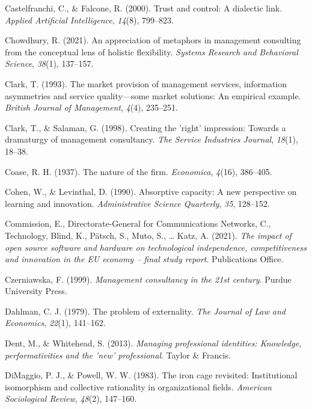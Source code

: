 \documentclass[
  man,floatsintext]{apa6}
\newlength{\cslhangindent}
\newenvironment{CSLReferences}[2] %
 {\begin{list}{}{%
  \setlength{\itemindent}{0pt}
  \setlength{\leftmargin}{0pt}
  \setlength{\parsep}{0pt}
  \ifodd #1
   \setlength{\leftmargin}{\cslhangindent}
   \setlength{\itemindent}{-1\cslhangindent}
  \fi
  \setlength{\itemsep}{#2\baselineskip}}}
 {\end{list}}
\begin{document}
\begin{CSLReferences}{1}{0}
Castelfranchi, C., \& Falcone, R. (2000). Trust and control: A dialectic link. \emph{Applied Artificial Intelligence}, \emph{14}(8), 799--823.

Chowdhury, R. (2021). An appreciation of metaphors in management consulting from the conceptual lens of holistic flexibility. \emph{Systems Research and Behavioral Science}, \emph{38}(1), 137--157.

Clark, T. (1993). The market provision of management services, information asymmetries and service quality---some market solutions: An empirical example. \emph{British Journal of Management}, \emph{4}(4), 235--251.

Clark, T., \& Salaman, G. (1998). Creating the 'right' impression: Towards a dramaturgy of management consultancy. \emph{The Service Industries Journal}, \emph{18}(1), 18--38.

Coase, R. H. (1937). The nature of the firm. \emph{Economica}, \emph{4}(16), 386--405.

Cohen, W., \& Levinthal, D. (1990). Absorptive capacity: A new perspective on learning and innovation. \emph{Administrative Science Quarterly}, \emph{35}, 128--152.

Commission, E., Directorate-General for Communications Networks, C., Technology, Blind, K., Pätsch, S., Muto, S., \ldots{} Katz, A. (2021). \emph{The impact of open source software and hardware on technological independence, competitiveness and innovation in the EU economy -- final study report}. Publications Office.

Czerniawska, F. (1999). \emph{Management consultancy in the 21st century}. Purdue University Press.

Dahlman, C. J. (1979). The problem of externality. \emph{The Journal of Law and Economics}, \emph{22}(1), 141--162.

Dent, M., \& Whitehead, S. (2013). \emph{Managing professional identities: Knowledge, performativities and the 'new' professional}. Taylor \& Francis.

DiMaggio, P. J., \& Powell, W. W. (1983). The iron cage revisited: Institutional isomorphism and collective rationality in organizational fields. \emph{American Sociological Review}, \emph{48}(2), 147--160.


\end{CSLReferences}
\end{document}
